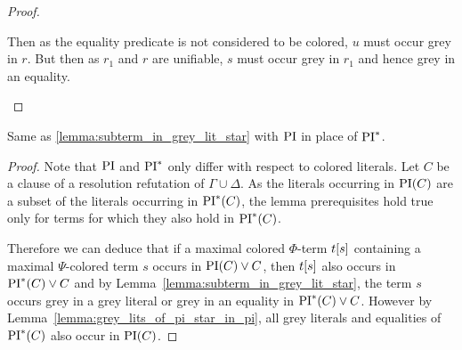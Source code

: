 \documentclass[%
	draft=false,%
	numbers=noendperiod,%
	11pt,%
	a4paper,%
	oneside,%
	openany,%
]{memoir}
\begin{document}
\begin{proof}
\begin{itemize}
\begin{itemize}
\begin{itemize}
\begin{itemize}
									Then as the equality predicate is not considered to be colored, $u$ must occur grey in $r$.
									But then as $r_1$ and $r$ are unifiable, $s$ must occur grey in $r_1$ and hence grey in an equality.
									\qedhere
							\end{itemize}

					\end{itemize}

			\end{itemize}

	\end{itemize}

\end{proof}

\begin{lemma}
	\label{lemma:subterm_in_grey_lit}
	Same as \ref{lemma:subterm_in_grey_lit_star} with $\operatorname{PI}$ in place of $\operatorname{PI}^*$.
\end{lemma}
\begin{proof}
	Note that $\operatorname{PI}$ and $\operatorname{PI}^*$ only differ with respect to colored literals.
	Let $C$ be a clause of a resolution refutation of $\Gamma \cup \Delta$.
	As the literals occurring in $\operatorname{PI}(C)$ are a subset of the literals occurring in $\operatorname{PI}^*(C)$, the lemma prerequisites hold true only for terms for which they also hold in $\operatorname{PI}^*(C)$.

	Therefore we can deduce that if a maximal colored $\Phi$-term $t[s]$ containing a maximal $\Psi$-colored term $s$ occurs in $\operatorname{PI}(C)\lor C$, then $t[s]$ also occurs in $\operatorname{PI}^*(C) \lor C$ and by Lemma~\ref{lemma:subterm_in_grey_lit_star},
	the term $s$ occurs grey in a grey literal or grey in an equality in $\operatorname{PI}^*(C) \lor C$.
	However by Lemma~\ref{lemma:grey_lits_of_pi_star_in_pi}, all grey literals and equalities of $\operatorname{PI}^*(C)$ also occur in $\operatorname{PI}(C)$.
\end{proof}
\end{document}
